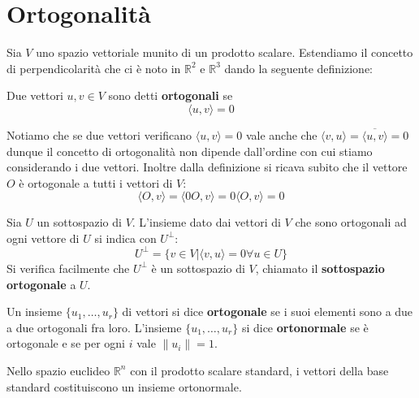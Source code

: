 \section{Ortogonalit\`a}
Sia $V$ uno spazio vettoriale munito di un prodotto scalare. Estendiamo il
concetto di perpendicolarit\`a che ci \`e noto in $\mathbb{R}^2$ e
$\mathbb{R}^3$ dando la seguente definizione:

\begin{defn}
	Due vettori $u, v \in V$ sono detti \textbf{ortogonali} se
	\begin{equation*}
		\langle u, v \rangle = 0
	\end{equation*}
\end{defn}

Notiamo che se due vettori verificano $\langle u, v \rangle = 0$ vale anche che
$\langle v, u \rangle = \overline{\langle u, v \rangle} = 0$ dunque il concetto
di ortogonalit\`a non dipende dall'ordine con cui stiamo considerando i due
vettori. Inoltre dalla definizione si ricava subito che il vettore $O$ \`e
ortogonale a tutti i vettori di $V$:
\begin{equation*}
	\langle O, v \rangle = \langle 0O, v \rangle = 0\langle O, v \rangle = 0
\end{equation*}

\begin{defn}
	Sia $U$ un sottospazio di $V$. L'insieme dato dai vettori di $V$ che sono
	ortogonali ad ogni vettore di $U$ si indica con $U^{\perp}$:
	\begin{equation*}
		U^{\perp} = \{v \in V | \langle v, u \rangle = 0 \forall u \in U\}
	\end{equation*}
	Si verifica facilmente che $U^{\perp}$ \`e un sottospazio di $V$, chiamato
	il \textbf{sottospazio ortogonale} a $U$.
\end{defn}

\begin{defn}
	Un insieme $\{u_1, \dots, u_r\}$ di vettori si dice \textbf{ortogonale} se
	i suoi elementi sono a due a due ortogonali fra loro. L'insieme
	$\{u_1, \dots, u_r\}$ si dice \textbf{ortonormale} se \`e ortogonale e se
	per ogni $i$ vale $\| u_i \| = 1$.
\end{defn}

\begin{example}
	Nello spazio euclideo $\mathbb{R}^n$ con il prodotto scalare standard,
	i vettori della base standard costituiscono un insieme ortonormale.
\end{example}

